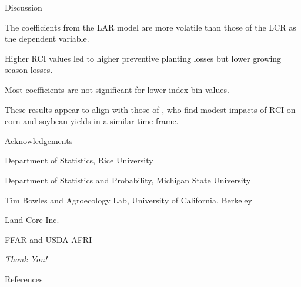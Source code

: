 \documentclass[notes,11pt, aspectratio=169]{beamer}
\newenvironment{wideitemize}{\itemize\addtolength{\itemsep}{10pt}}{\enditemize}
\begin{document}
\begin{frame}{Discussion}
    \begin{wideitemize}
        \item The coefficients from the LAR model are more volatile than those of the LCR as the dependent variable.
        \item Higher RCI values led to higher preventive planting losses but lower growing season losses.
        \item Most coefficients are not significant for lower index bin values.
        \item These results appear to align with those of \cite{burchfield2024}, who find modest impacts of RCI on corn and soybean yields in a similar time frame.
    \end{wideitemize}
\end{frame}

\begin{frame}{Acknowledgements}
    \centering
    \begin{wideitemize}
        \item Department of Statistics, Rice University
        \item Department of Statistics and Probability, Michigan State University
        \item Tim Bowles and Agroecology Lab, University of California, Berkeley
        \item Land Core Inc.
        \item FFAR and USDA-AFRI
    \end{wideitemize}
\end{frame}

\begin{frame}{}
	\centering \Huge
	\emph{Thank You!}
\end{frame}
	
\begin{frame}[allowframebreaks]{References}
		
\end{frame}	
\end{document}
